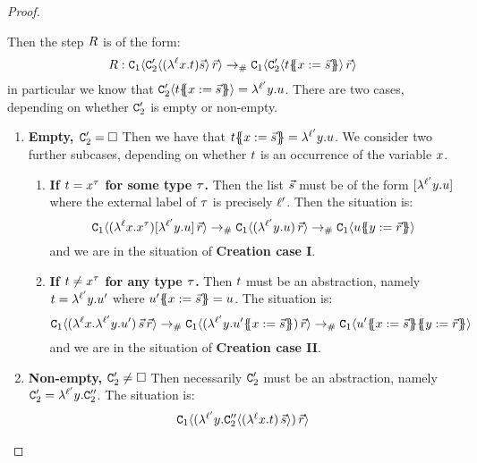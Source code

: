 \begin{proof}
\begin{enumerate}
\begin{enumerate}
    Then the step $R$ is of the form:
    \[
      R :
      \mathtt{C}_1\langle\mathtt{C}'_2\langle(\lambda^{\ell} x. t)\vec{s}\rangle\,\vec{r}\rangle
      \mathrel{\to_{\mathtt{\#}}}
      \mathtt{C}_1\langle\mathtt{C}'_2\langle t\{\!\!\{x := \vec{s}\}\!\!\}\rangle\,\vec{r}\rangle
    \]
    in particular we know that $\mathtt{C}'_2\langle t\{\!\!\{x := \vec{s}\}\!\!\}\rangle = \lambda^{\ell'} y. u$.
    There are two cases, depending on whether $\mathtt{C}'_2$ is empty or non-empty.
    \begin{enumerate}
    \item {\bf Empty, $\mathtt{C}'_2 = \Box$}
      Then we have that $t\{\!\!\{x := \vec{s}\}\!\!\} = \lambda^{\ell'} y. u$.
      We consider two further subcases, depending on whether $t$ is an occurrence of the variable $x$.
      \begin{enumerate}
      \item {\bf If $t = x^{\tau}$ for some type $\tau$.}
        Then the list $\vec{s}$ must be of the form $[\lambda^{\ell'} y. u]$
        where the external label of $\tau$ is precisely $\ell'$.
        Then the situation is:
        \[
          \mathtt{C}_1\langle(\lambda^{\ell} x. x^{\tau})[\lambda^{\ell'} y. u]\,\vec{r}\rangle
          \mathrel{\to_{\mathtt{\#}}}
          \mathtt{C}_1\langle(\lambda^{\ell'} y. u)\,\vec{r}\rangle
          \mathrel{\to_{\mathtt{\#}}}
          \mathtt{C}_1\langle u\{\!\!\{y := \vec{r}\}\!\!\}\rangle
        \]
        and we are in the situation of {\bf Creation case I}.
      \item {\bf If $t \neq x^{\tau}$ for any type $\tau$.}
        Then $t$ must be an abstraction, namely $t = \lambda^{\ell'} y. u'$
        where $u'\{\!\!\{x := \vec{s}\}\!\!\} = u$. 
        The situation is:
        \[
          \con_1\of{(\lamp{\lab}{\var}{\lamp{\labtwo}{\vartwo}{\tmthree'}})\,\ls{\tmtwo}\,\ls{\tmfour}}
          \todist
          \con_1\of{(\lamp{\labtwo}{\vartwo}{\tmthree'\sub{\var}{\ls{\tmtwo}}})\,\ls{\tmfour}}
          \todist
          \con_1\of{\tmthree'\sub{\var}{\ls{\tmtwo}}\sub{\vartwo}{\ls{\tmfour}}}
        \]
        and we are in the situation of {\bf Creation case II}.
      \end{enumerate}
    \item {\bf Non-empty, $\mathtt{C}'_2 \neq \Box$}
      Then necessarily $\mathtt{C}'_2$ must be an abstraction, namely $\mathtt{C}'_2 = \lambda^{\ell'} y. \mathtt{C}''_2$.
      The situation is:
      \[
        \begin{array}{rcl}
        \mathtt{C}_1\langle(\lambda^{\ell'} y. \mathtt{C}''_2\langle (\lambda^{\ell} x. t)\,\vec{s} \rangle)\,\vec{r}\rangle

\end{array}\]
\end{enumerate}
\end{enumerate}
\end{enumerate}
\end{proof}
